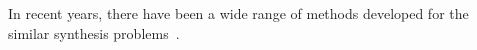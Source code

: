 In recent years, there have been a wide range of methods
developed for the similar synthesis problems~\cite{sktech,ceSynth,exampleSynth}.


